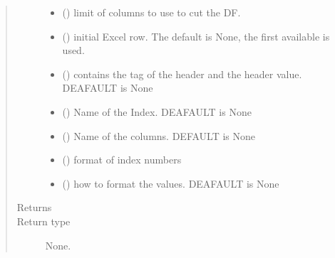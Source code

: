 \documentclass[letterpaper,10pt,english]{sphinxmanual}
\begin{document}
\begin{fulllineitems}
\begin{fulllineitems}
\begin{quote}
\begin{description}
\begin{itemize}
\item {} 
\sphinxAtStartPar
{} () \textendash{} limit of columns to use to cut the DF.

\item {} 
\sphinxAtStartPar
{} (\sphinxstyleliteralemphasis{\sphinxupquote{, }}) \textendash{} initial Excel row. The default is None,
the first available is used.

\item {} 
\sphinxAtStartPar
{} (\sphinxstyleliteralemphasis{\sphinxupquote{ (}}\sphinxstyleliteralemphasis{\sphinxupquote{, }}\sphinxstyleliteralemphasis{\sphinxupquote{)}}) \textendash{} contains the tag of the header and the header value. DEAFAULT is
None

\item {} 
\sphinxAtStartPar
{} () \textendash{} Name of the Index. DEAFAULT is None

\item {} 
\sphinxAtStartPar
{} () \textendash{} Name of the columns. DEFAULT is None

\item {} 
\sphinxAtStartPar
{} () \textendash{} format of index numbers

\item {} 
\sphinxAtStartPar
{} () \textendash{} how to format the values. DEAFAULT is None

\end{itemize}

\item[{Returns}] \leavevmode
\sphinxAtStartPar


\item[{Return type}] \leavevmode
\sphinxAtStartPar
None.


\end{description}
\end{quote}
\end{fulllineitems}
\end{fulllineitems}
\end{document}
